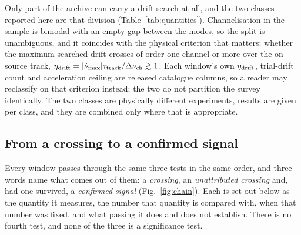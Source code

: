 Only part of the archive can carry a drift search at all, and the two
classes reported here are that division (Table~\ref{tab:quantities}).
Channelisation in the sample is bimodal with an empty gap between the
modes, so the split is unambiguous, and it coincides with the physical
criterion that matters: whether the maximum searched drift crosses of
order one channel or more over the on-source track, $\eta_{\rm drift} =
|\dot\nu_{\max}|\tau_{\rm track}/\Delta\nu_{\rm ch} \gtrsim 1$. Each
window's own $\eta_{\rm drift}$, trial-drift count and acceleration
ceiling are released catalogue columns, so a reader may reclassify on that
criterion instead; the two do not partition the survey identically. The
two classes are physically different experiments, results are given per
class, and they are combined only where that is appropriate.

\subsection{From a crossing to a confirmed signal}
\label{sec:summary}

Every window passes through the same three tests in the same order, and
three words name what comes out of them: a \emph{crossing}, an
\emph{unattributed crossing} and, had one survived, a \emph{confirmed
signal} (Fig.~\ref{fig:chain}). Each is set out below as the quantity it
measures, the number that quantity is compared with, when that number was
fixed, and what passing it does and does not establish. There is no fourth
test, and none of the three is a significance test.

